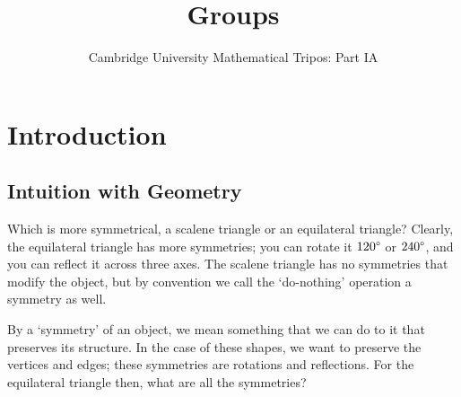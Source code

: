 \documentclass{article}
\title{Groups}
\author{Cambridge University Mathematical Tripos: Part IA}
\begin{document}
\maketitle

\tableofcontents
\newpage

\section{Introduction}
\subsection{Intuition with Geometry}
Which is more symmetrical, a scalene triangle or an equilateral triangle? Clearly, the equilateral triangle has more symmetries; you can rotate it $120\degree$ or $240\degree$, and you can reflect it across three axes. The scalene triangle has no symmetries that modify the object, but by convention we call the `do-nothing' operation a symmetry as well.

By a `symmetry' of an object, we mean something that we can do to it that preserves its structure. In the case of these shapes, we want to preserve the vertices and edges; these symmetries are rotations and reflections. For the equilateral triangle then, what are all the symmetries?

\end{document}
